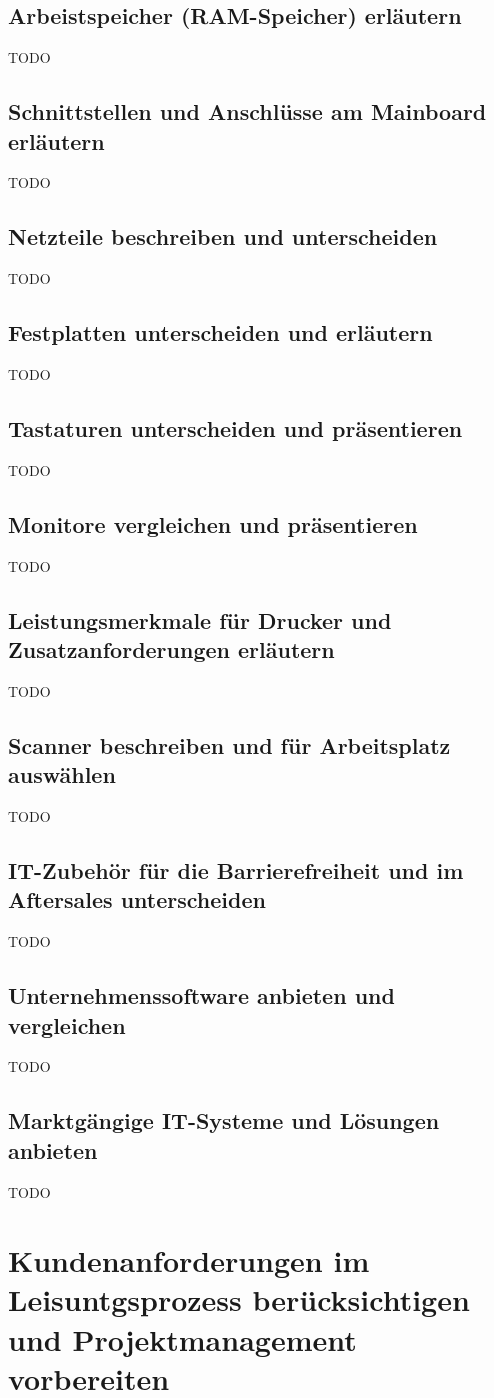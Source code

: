 \documentclass[11pt]{article}
\begin{document}
\subsection{Arbeistspeicher (RAM-Speicher) erläutern}
    TODO
\subsection{Schnittstellen und Anschlüsse am Mainboard erläutern}
    TODO
\subsection{Netzteile beschreiben und unterscheiden}
    TODO
\subsection{Festplatten unterscheiden und erläutern}
    TODO
\subsection{Tastaturen unterscheiden und präsentieren}
    TODO
\subsection{Monitore vergleichen und präsentieren}
    TODO
\subsection{Leistungsmerkmale für Drucker und Zusatzanforderungen erläutern}
    TODO
\subsection{Scanner beschreiben und für Arbeitsplatz auswählen}
    TODO
\subsection{IT-Zubehör für die Barrierefreiheit und im Aftersales unterscheiden}
    TODO
\subsection{Unternehmenssoftware anbieten und vergleichen}
    TODO
\subsection{Marktgängige IT-Systeme und Lösungen anbieten}
    TODO

\newpage
\section{Kundenanforderungen im Leisuntgsprozess berücksichtigen und Projektmanagement vorbereiten}
\end{document}
